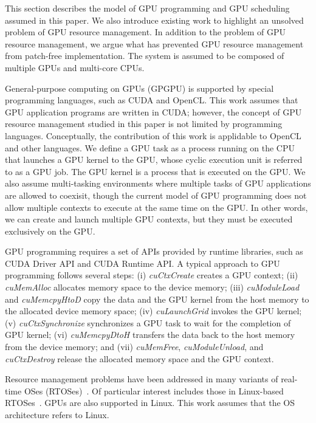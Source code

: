 \label{sec:system_model}
This section describes the model of GPU programming and GPU scheduling
assumed in this paper.
We also introduce existing work to highlight an unsolved problem of GPU
resource management.
In addition to the problem of GPU resource management, we argue what has
prevented GPU resource management from patch-free implementation. 
The system is assumed to be composed of multiple GPUs and multi-core
CPUs.

General-purpose computing on GPUs (GPGPU) is supported by special
programming languages, such as CUDA and OpenCL.
This work assumes that GPU application programs are written in CUDA;
however, the concept of GPU resource management studied in this paper is
not limited by programming languages.
Conceptually, the contribution of this work is applidable to OpenCL and
other languages.
We define a GPU task as a process running on the CPU that launches a GPU
kernel to the GPU, whose cyclic execution unit is referred to as a GPU
job.
The GPU kernel is a process that is executed on the GPU. 
We also assume multi-tasking environments where multiple tasks of GPU
applications are allowed to coexisit, though the current model of GPU
programming does not allow multiple contexts to execute at the same time
on the GPU.
In other words, we can create and launch multiple GPU contexts, but they
must be executed exclusively on the GPU.

GPU programming requires a set of APIs provided by runtime libraries,
such as CUDA Driver API and CUDA Runtime API.
A typical approach to GPU programming follows several steps:
(i) \textit{cuCtxCreate} creates a GPU context;
(ii) \textit{cuMemAlloc} allocates memory space to the device memory; 
(iii) \textit{cuModuleLoad} and \textit{cuMemcpyHtoD} copy the data and
the GPU kernel from the host memory to the allocated device memory
space;
(iv) \textit{cuLaunchGrid} invokes the GPU kernel;
(v) \textit{cuCtxSynchronize} synchronizes a GPU task to wait for the
completion of GPU kernel;
(vi) \textit{cuMemcpyDtoH} transfers the data back to the host memory
from the device memory; and
(vii) \textit{cuMemFree}, \textit{cuModuleUnload}, and \textit{cuCtxDestroy} release the allocated memory space and the GPU context.

Resource management problems have been addressed in many variants of
real-time OSes (RTOSes)~\cite{spring,redline,itron,rk}.
Of particular interest includes those in Linux-based
RTOSes~\cite{litmus,prk,rtai,yodaiken1999rtlinux,kato2009loadable}.
GPUs are also supported in Linux.
This work assumes that the OS architecture refers to Linux.

